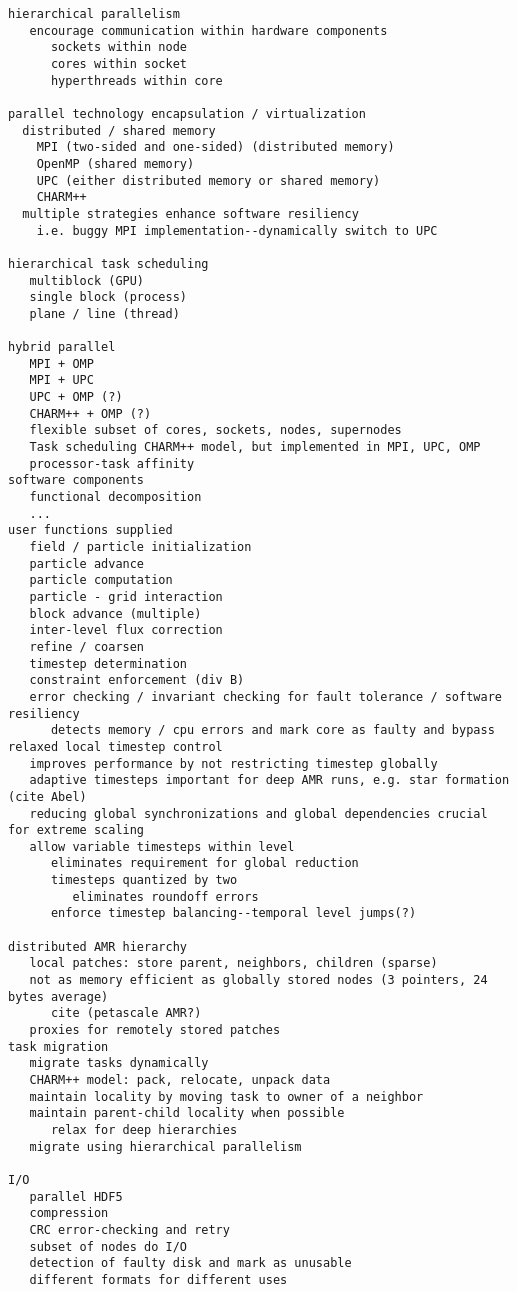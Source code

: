 \documentclass[14pt,letter]{article}
\begin{document}
\begin{verbatim}
hierarchical parallelism
   encourage communication within hardware components
      sockets within node
      cores within socket
      hyperthreads within core

parallel technology encapsulation / virtualization
  distributed / shared memory
    MPI (two-sided and one-sided) (distributed memory)
    OpenMP (shared memory) 
    UPC (either distributed memory or shared memory)
    CHARM++
  multiple strategies enhance software resiliency
    i.e. buggy MPI implementation--dynamically switch to UPC

hierarchical task scheduling
   multiblock (GPU)
   single block (process)
   plane / line (thread)

hybrid parallel
   MPI + OMP
   MPI + UPC
   UPC + OMP (?)
   CHARM++ + OMP (?)
   flexible subset of cores, sockets, nodes, supernodes
   Task scheduling CHARM++ model, but implemented in MPI, UPC, OMP
   processor-task affinity
software components
   functional decomposition
   ...
user functions supplied
   field / particle initialization
   particle advance
   particle computation
   particle - grid interaction
   block advance (multiple)
   inter-level flux correction
   refine / coarsen
   timestep determination
   constraint enforcement (div B)
   error checking / invariant checking for fault tolerance / software resiliency
      detects memory / cpu errors and mark core as faulty and bypass
relaxed local timestep control
   improves performance by not restricting timestep globally
   adaptive timesteps important for deep AMR runs, e.g. star formation (cite Abel)
   reducing global synchronizations and global dependencies crucial for extreme scaling
   allow variable timesteps within level
      eliminates requirement for global reduction
      timesteps quantized by two
         eliminates roundoff errors
      enforce timestep balancing--temporal level jumps(?)

distributed AMR hierarchy
   local patches: store parent, neighbors, children (sparse)
   not as memory efficient as globally stored nodes (3 pointers, 24 bytes average)
      cite (petascale AMR?)
   proxies for remotely stored patches
task migration
   migrate tasks dynamically
   CHARM++ model: pack, relocate, unpack data
   maintain locality by moving task to owner of a neighbor
   maintain parent-child locality when possible
      relax for deep hierarchies
   migrate using hierarchical parallelism

I/O
   parallel HDF5
   compression
   CRC error-checking and retry
   subset of nodes do I/O
   detection of faulty disk and mark as unusable
   different formats for different uses


\end{verbatim}
\end{document}
